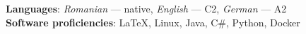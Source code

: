 
\smallskip
{}%
\textbf{Languages}: \emph{Romanian} --- native, \emph{English} --- C2, \emph{German} --- A2\\
\textbf{Software proficiencies}: \LaTeX, Linux, Java, C\#, Python, Docker
